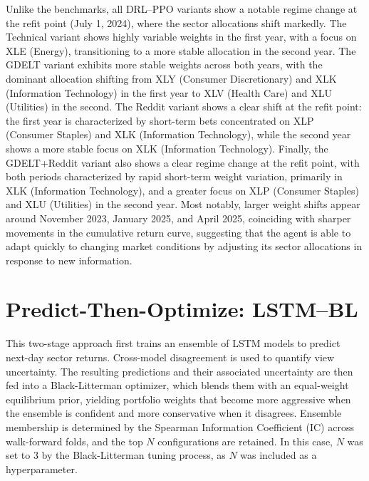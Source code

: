Unlike the benchmarks, all DRL--PPO variants show a notable regime change at the refit point (July 1, 2024), where the sector allocations shift markedly. The Technical variant shows highly variable weights in the first year, with a focus on XLE (Energy), transitioning to a more stable allocation in the second year. The GDELT variant exhibits more stable weights across both years, with the dominant allocation shifting from XLY (Consumer Discretionary) and XLK (Information Technology) in the first year to XLV (Health Care) and XLU (Utilities) in the second. The Reddit variant shows a clear shift at the refit point: the first year is characterized by short-term bets concentrated on XLP (Consumer Staples) and XLK (Information Technology), while the second year shows a more stable focus on XLK (Information Technology). Finally, the GDELT+Reddit variant also shows a clear regime change at the refit point, with both periods characterized by rapid short-term weight variation, primarily in XLK (Information Technology), and a greater focus on XLP (Consumer Staples) and XLU (Utilities) in the second year. Most notably, larger weight shifts appear around November 2023, January 2025, and April 2025, coinciding with sharper movements in the cumulative return curve, suggesting that the agent is able to adapt quickly to changing market conditions by adjusting its sector allocations in response to new information.


\section{Predict-Then-Optimize: LSTM--BL}

This two-stage approach first trains an ensemble of LSTM models to predict next-day sector returns. Cross-model disagreement is used to quantify view uncertainty. The resulting predictions and their associated uncertainty are then fed into a Black-Litterman optimizer, which blends them with an equal-weight equilibrium prior, yielding portfolio weights that become more aggressive when the ensemble is confident and more conservative when it disagrees. Ensemble membership is determined by the Spearman Information Coefficient (IC) across walk-forward folds, and the top $N$ configurations are retained. In this case, $N$ was set to 3 by the Black-Litterman tuning process, as $N$ was included as a hyperparameter.

